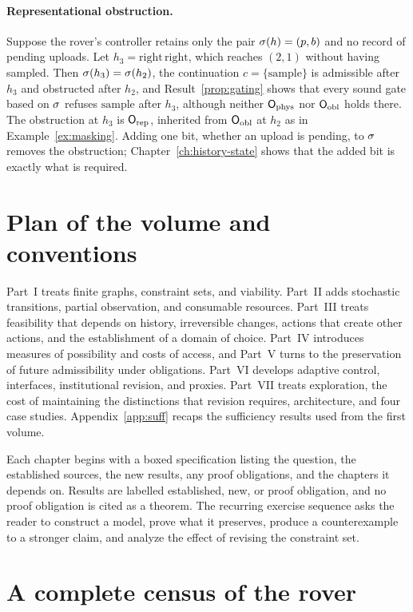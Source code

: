 \paragraph{Representational obstruction.} Suppose the rover's controller retains only the pair $\sigma(h)=(p,b)$ and no record of pending uploads. Let $h_3=\mathrm{right}\,\mathrm{right}$, which reaches $(2,1)$ without having sampled. Then $\sigma(h_3)=\sigma(h_2)$, the continuation $c=\{\mathrm{sample}\}$ is admissible after $h_3$ and obstructed after $h_2$, and Result~\ref{prop:gating} shows that every sound gate based on $\sigma$ refuses $\mathrm{sample}$ after $h_3$, although neither $\mathsf{O}_{\mathrm{phys}}$ nor $\mathsf{O}_{\mathrm{obl}}$ holds there. The obstruction at $h_3$ is $\mathsf{O}_{\mathrm{rep}}$, inherited from $\mathsf{O}_{\mathrm{obl}}$ at $h_2$ as in Example~\ref{ex:masking}. Adding one bit, whether an upload is pending, to $\sigma$ removes the obstruction; Chapter~\ref{ch:history-state} shows that the added bit is exactly what is required.

\section{Plan of the volume and conventions}

Part~I treats finite graphs, constraint sets, and viability. Part~II adds stochastic transitions, partial observation, and consumable resources. Part~III treats feasibility that depends on history, irreversible changes, actions that create other actions, and the establishment of a domain of choice. Part~IV introduces measures of possibility and costs of access, and Part~V turns to the preservation of future admissibility under obligations. Part~VI develops adaptive control, interfaces, institutional revision, and proxies. Part~VII treats exploration, the cost of maintaining the distinctions that revision requires, architecture, and four case studies. Appendix~\ref{app:suff} recaps the sufficiency results used from the first volume.

Each chapter begins with a boxed specification listing the question, the established sources, the new results, any proof obligations, and the chapters it depends on. Results are labelled established, new, or proof obligation, and no proof obligation is cited as a theorem. The recurring exercise sequence asks the reader to construct a model, prove what it preserves, produce a counterexample to a stronger claim, and analyze the effect of revising the constraint set.


\section{A complete census of the rover}\label{sec:census}


